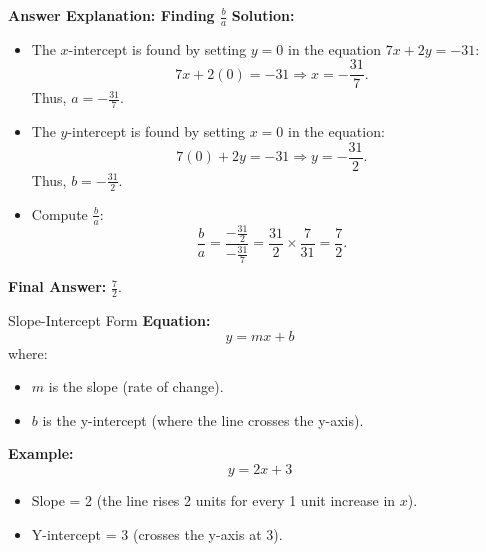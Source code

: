 \documentclass{beamer}
\begin{document}
\begin{frame}{\textbf{Answer Explanation: Finding \( \frac{b}{a} \)}}
    \textbf{Solution:}
    \begin{itemize}
        \item The \( x \)-intercept is found by setting \( y = 0 \) in the equation \( 7x + 2y = -31 \):
        \[
        7x + 2(0) = -31 \Rightarrow x = -\frac{31}{7}.
        \]
        Thus, \( a = -\frac{31}{7} \).

        \item The \( y \)-intercept is found by setting \( x = 0 \) in the equation:
        \[
        7(0) + 2y = -31 \Rightarrow y = -\frac{31}{2}.
        \]
        Thus, \( b = -\frac{31}{2} \).

        \item Compute \( \frac{b}{a} \):
        \[
        \frac{b}{a} = \frac{-\frac{31}{2}}{-\frac{31}{7}} = \frac{31}{2} \times \frac{7}{31} = \frac{7}{2}.
        \]

    \end{itemize}
    \textbf{Final Answer:} \( \boxed{\frac{7}{2}} \).
\end{frame}





\begin{frame}{Slope-Intercept Form}
    \textbf{Equation:}
    \[
    y = mx + b
    \]
    where:
    \begin{itemize}
        \item \( m \) is the slope (rate of change).
        \item \( b \) is the y-intercept (where the line crosses the y-axis).
    \end{itemize}

    \vspace{0.5cm}
    \textbf{Example:}
    \[
    y = 2x + 3
    \]
    \begin{itemize}
        \item Slope = 2 (the line rises 2 units for every 1 unit increase in \( x \)).
        \item Y-intercept = 3 (crosses the y-axis at 3).
    \end{itemize}
\end{frame}
\end{document}
